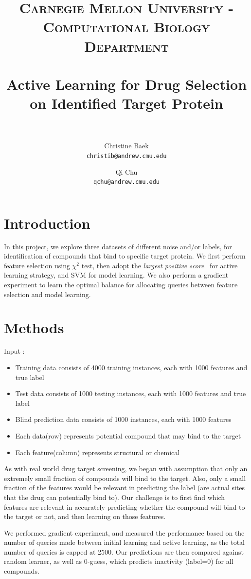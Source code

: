 \documentclass[paper=a4, fontsize=11pt]{scrartcl}
\title{
    \usefont{OT1}{bch}{b}{n}
    \normalfont \normalsize \textsc{Carnegie Mellon University - Computational Biology Department} \\ [25pt]
    \horrule{0.5pt} \\[0.4cm]
    \huge Active Learning for Drug Selection\\ on Identified Target Protein \\
    \horrule{2pt} \\[0.5cm]
}
\author{
  Christine Baek\\
  \normalsize\texttt{christib@andrew.cmu.edu}
  \and
  Qi Chu\\
  \normalsize\texttt{qchu@andrew.cmu.edu}
  \date{}
}
\date{}
\numberwithin{equation}{section}    %
\numberwithin{figure}{section}      %
\numberwithin{table}{section}       %
\numberwithin{equation}{section}    %
\numberwithin{figure}{section}      %
\numberwithin{table}{section}       %
\begin{document}
\maketitle
\section{Introduction}
In this project, we explore three datasets of different noise and/or labels, for identification of compounds that bind to specific target protein. We first perform feature selection using $\chi^2$ test, then adopt the \textit{largest positive score}~\cite{ref:warmuth} for active learning strategy, and SVM for model learning. We also perform a gradient experiment to learn the optimal balance for allocating queries between feature selection and model learning.



\section{Methods}

Input :
\begin{itemize}
\item Training data consists of 4000 training instances, each with 1000 features and true label 
\item Test data consists of 1000 testing instances, each with 1000 features and true label
\item Blind prediction data consists of 1000 instances, each with 1000 features
\item Each data(row) represents potential compound that may bind to the target
\item Each feature(column) represents structural or chemical 
\end{itemize}




As with real world drug target screening, we began with assumption that only an extremely small fraction of compounds will bind to the target. Also, only a small fraction of the features would be relevant in predicting the label (are actual sites that the drug can potentially bind to). Our challenge is to first find which features are relevant in accurately predicting whether the compound will bind to the target or not, and then learning on those features.


We performed gradient experiment, and measured the performance based on the number of queries made between initial learning and active learning, as the total number of queries is capped at 2500. Our predictions are then compared against random learner, as well as 0-guess, which predicts inactivity (label=0) for all compounds. 
\end{document}
